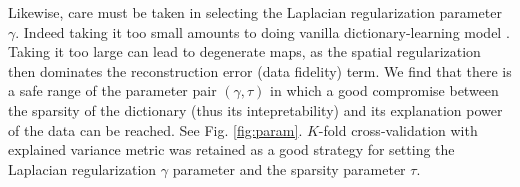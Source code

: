 Likewise, care must be taken in selecting the Laplacian regularization parameter $\gamma$. Indeed taking it too small amounts to doing vanilla dictionary-learning model  \cite{mairal2010}. Taking it too large can lead to degenerate maps, as the spatial regularization then dominates the reconstruction error (data fidelity) term.
We find that there is a safe range of the parameter pair $(\gamma, \tau)$ in which a good compromise between the sparsity of the dictionary (thus its intepretability) and its explanation power of the data can be reached. See Fig. \ref{fig:param}.
$K$-fold cross-validation with explained variance metric
was retained as a good strategy for setting the Laplacian regularization $\gamma$ parameter and the sparsity parameter $\tau$.






